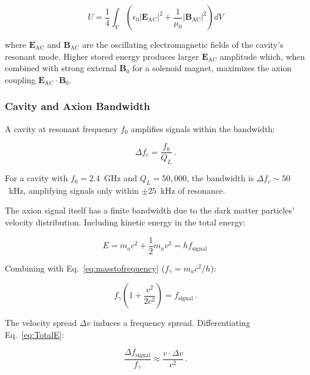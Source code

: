     \begin{equation}
        U = \frac{1}{4} \int_V \left( \epsilon_0 |\mathbf{E}_{\text{AC}}|^2 + \frac{1}{\mu_0} |\mathbf{B}_{\text{AC}}|^2 \right) dV
        \label{eq:stored_energy}
    \end{equation}
    
    \noindent where $\mathbf{E}_{\text{AC}}$ and $\mathbf{B}_{\text{AC}}$ are the oscillating electromagnetic fields of the cavity's resonant mode. Higher stored energy produces larger $\mathbf{E}_{\text{AC}}$ amplitude which, when combined with strong external $\mathbf{B}_0$ for a solenoid magnet, maximizes the axion coupling $\mathbf{E}_{\text{AC}} \cdot \mathbf{B}_0$.

    \subsubsection{Cavity and Axion Bandwidth}

    A cavity at resonant frequency $f_0$ amplifies signals within the bandwidth:

    \begin{equation}
        \Delta f_c = \frac{f_0}{Q_L}\,.
        \label{eq:bandwidth}
    \end{equation}
    
    \noindent For a cavity with $f_0 = 2.4$~GHz and $Q_L = 50{,}000$, the bandwidth is $\Delta f_c \sim 50$~kHz, amplifying signals only within $\pm25$~kHz of resonance.

    The axion signal itself has a finite bandwidth due to the dark matter particles' velocity distribution. Including kinetic energy in the total energy:
        
    \begin{equation}
       E =  m_ac^2 +  \frac{1}{2}m_av^2 = hf_{\text{signal}} \,
        \label{eq:totalEnergy}
    \end{equation}
        
    \noindent Combining with Eq.~\ref{eq:masstofrequency} ($f_{\gamma} = m_ac^2/h$):

    \begin{equation}
        f_{\gamma} \left( 1+ \frac{v^2}{2c^2}\right) = f_{\text{signal}} \,.
        \label{eq:TotalE}
    \end{equation}

    \noindent The velocity spread $\Delta v$ induces a frequency spread. Differentiating Eq.~\ref{eq:TotalE}:

    \begin{equation}
        \frac{\Delta f_{\text{signal}}}{f_{\gamma}} \approx \frac{v \cdot \Delta v}{c^2} \,.
        \label{eq:FSpreadVSpread}
    \end{equation}

